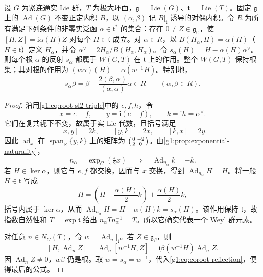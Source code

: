 \begin{proposition}\label{g1:prop:root-reflection-realized}
	设 \(G\) 为紧连通实 Lie 群，\(T\) 为极大环面，\(\mathfrak g=\operatorname{Lie}(G)\)、\(\mathfrak t=\operatorname{Lie}(T)\)。固定 \(\mathfrak g\) 上的 \(\operatorname{Ad}(G)\) 不变正定内积 \(B\)，以 \((\alpha,\beta)\) 记 \(B|_{\mathfrak t}\) 诱导的对偶内积。令 \(R\) 为所有满足下列条件的非零实泛函 \(\alpha\in\mathfrak t^*\) 的集合：存在 \(0\ne Z\in\mathfrak g_{\mathbb C}\)，使 \([H,Z]=\mathrm{i}\alpha(H)Z\) 对每个 \(H\in\mathfrak t\) 成立。对 \(\alpha\in R\)，以 \(B(H_\alpha,H)=\alpha(H)\)（\(H\in\mathfrak t\)）定义 \(H_\alpha\)，并令 \(\alpha^\vee=2H_\alpha/B(H_\alpha,H_\alpha)\)。令 \(s_\alpha(H)=H-\alpha(H)\alpha^\vee\)。则每个根 \(\alpha\) 的反射 \(s_\alpha\) 都属于 \(W(G,T)\) 在 \(\mathfrak t\) 上的作用。整个 \(W(G,T)\) 保持根集；其对根的作用为 \((w\alpha)(H)=\alpha(w^{-1}H)\)。特别地，
	\[
		s_\alpha\beta
		=\beta-\frac{2(\beta,\alpha)}{(\alpha,\alpha)}\alpha
		\in R\qquad(\alpha,\beta\in R).
	\]
\end{proposition}
\begin{proof}
	沿用\eqref{g1:eq:root-sl2-triple}中的 \(e,f,h\)，令
	\[
		x=e-f,\qquad y=\mathrm{i}(e+f),\qquad k=\mathrm{i}h=\alpha^\vee.
	\]
	它们在复共轭下不变，故属于实 Lie 代数，且括号满足
	\[
		[x,y]=2k,\qquad [y,k]=2x,\qquad[k,x]=2y.
	\]
	因此 \(\operatorname{ad}_x\) 在 \(\operatorname{span}_{\mathbb R}\{y,k\}\) 上的矩阵为
	\(\begin{psmallmatrix}0&-2\\2&0\end{psmallmatrix}\)。由\cref{g1:prop:exponential-naturality}，
	\[
		n_\alpha=\exp_G(\tfrac\pi2x)
		\quad\Longrightarrow\quad
		\operatorname{Ad}_{n_\alpha}k=-k.
	\]
	若 \(H\in\ker\alpha\)，则它与 \(e,f\) 都交换，因而与 \(x\) 交换，得到 \(\operatorname{Ad}_{n_\alpha}H=H\)。将一般 \(H\in\mathfrak t\) 写成
	\[
		H=\left(H-\frac{\alpha(H)}2k\right)+\frac{\alpha(H)}2k,
	\]
	括号内属于 \(\ker\alpha\)，从而 \(\operatorname{Ad}_{n_\alpha}H=H-\alpha(H)k=s_\alpha(H)\)。该作用保持 \(\mathfrak t\)，故指数自然性和 \(T=\exp\mathfrak t\) 给出 \(n_\alpha Tn_\alpha^{-1}=T\)。所以它确实代表一个 Weyl 群元素。

	对任意 \(n\in N_G(T)\)，令 \(w=\operatorname{Ad}_n|_{\mathfrak t}\)。若 \(Z\in\mathfrak g_\beta\)，则
	\[
		[H,\operatorname{Ad}_nZ]
		=\operatorname{Ad}_n[w^{-1}H,Z]
		=\mathrm{i}\beta(w^{-1}H)\operatorname{Ad}_nZ.
	\]
	因 \(\operatorname{Ad}_nZ\ne0\)，\(w\beta\) 仍是根。取 \(w=s_\alpha=w^{-1}\)，代入\eqref{g1:eq:coroot-reflection}，便得最后的公式。
\end{proof}

